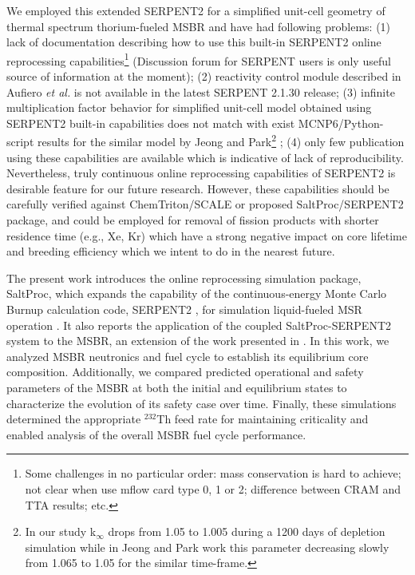 We employed this extended SERPENT2 for a simplified unit-cell geometry of 
thermal spectrum thorium-fueled \gls{MSBR} and have had following problems: (1) 
lack of documentation describing how to use this built-in SERPENT2 online 
reprocessing capabilities\footnote{ Some challenges in no particular order: 
mass conservation is hard to achieve; not clear when use mflow card type 0, 1 or 2; 
difference between CRAM and TTA results; etc.} 
(Discussion forum for SERPENT users is only useful 
source of information at the moment); (2) reactivity control module described in Aufiero \emph{et al.} is 
not available in the latest SERPENT 2.1.30 release; (3) infinite multiplication 
factor behavior for simplified unit-cell model obtained using SERPENT2 built-in 
capabilities \cite{rykhlevskii_online_2017} does not match with exist MCNP6/Python-script
 results for the similar model by Jeong and Park\footnote{ In our 
study k$_{\infty}$ drops from 1.05 to 1.005 during a 1200 days of depletion simulation 
while in Jeong and Park work this parameter decreasing slowly from 1.065 to 1.05 for the 
similar time-frame.} \cite{jeong_equilibrium_2016}; (4) only few publication \cite{aufiero_extended_2013, 
ashraf_nuclear_2018} using these capabilities are available 
which is indicative of lack of reproducibility. Nevertheless, truly continuous 
online reprocessing capabilities of SERPENT2 is desirable feature for our 
future research. However, these capabilities should be carefully verified against 
ChemTriton/SCALE or proposed SaltProc/SERPENT2 package, and could be employed 
for removal of fission products with shorter residence time (e.g., Xe, Kr) which 
have a strong negative impact on core lifetime and breeding efficiency which 
we intent to do in the nearest future.

The present work introduces the online reprocessing simulation package, SaltProc, 
which expands the capability of the continuous-energy Monte Carlo Burnup 
calculation code, SERPENT2 \cite{leppanen_serpent_2015}, for simulation 
liquid-fueled \gls{MSR} operation 
\cite{rykhlevskii_arfc/saltproc:_2018}. It also reports the 
application of the coupled SaltProc-SERPENT2 system to the \gls{MSBR}, an 
extension of the work presented in 
\cite{rykhlevskii_full-core_2017, rykhlevskii_online_2017}. In this work, we 
analyzed \gls{MSBR} neutronics and fuel cycle to establish its equilibrium core 
composition. Additionally, we compared predicted operational and safety parameters of the \gls{MSBR} at 
both the initial and equilibrium states to characterize the evolution of its 
safety case over time. Finally, these simulations determined the appropriate $^{232}$Th feed rate  
for maintaining criticality and enabled analysis of the overall \gls{MSBR} fuel 
cycle performance.

